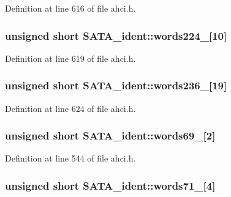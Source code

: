Definition at line 616 of file ahci.\+h.

\subsubsection[{\texorpdfstring{words224\+\_\+233}{words224_233}}]{\setlength{\rightskip}{0pt plus 5cm}unsigned short S\+A\+T\+A\+\_\+ident\+::words224\+\_\mbox{[}10\mbox{]}}\hypertarget{structSATA__ident_a1b7fe4d0ce0792c7d6e0c5b3ecfa7063}{}\label{structSATA__ident_a1b7fe4d0ce0792c7d6e0c5b3ecfa7063}


Definition at line 619 of file ahci.\+h.

\subsubsection[{\texorpdfstring{words236\+\_\+254}{words236_254}}]{\setlength{\rightskip}{0pt plus 5cm}unsigned short S\+A\+T\+A\+\_\+ident\+::words236\+\_\mbox{[}19\mbox{]}}\hypertarget{structSATA__ident_ab3312fab93f9e413abe360b4a1823c7b}{}\label{structSATA__ident_ab3312fab93f9e413abe360b4a1823c7b}


Definition at line 624 of file ahci.\+h.

\subsubsection[{\texorpdfstring{words69\+\_\+70}{words69_70}}]{\setlength{\rightskip}{0pt plus 5cm}unsigned short S\+A\+T\+A\+\_\+ident\+::words69\+\_\mbox{[}2\mbox{]}}\hypertarget{structSATA__ident_a92889f3e742cf5d85af65e26a83701c0}{}\label{structSATA__ident_a92889f3e742cf5d85af65e26a83701c0}


Definition at line 544 of file ahci.\+h.

\subsubsection[{\texorpdfstring{words71\+\_\+74}{words71_74}}]{\setlength{\rightskip}{0pt plus 5cm}unsigned short S\+A\+T\+A\+\_\+ident\+::words71\+\_\mbox{[}4\mbox{]}}\hypertarget{structSATA__ident_a6cc31fab7053c53b3797051c0d9013a8}{}\label{structSATA__ident_a6cc31fab7053c53b3797051c0d9013a8}


